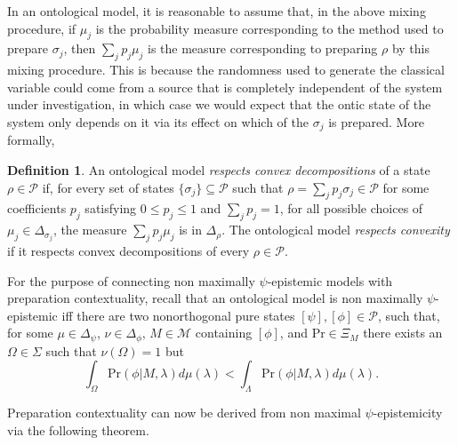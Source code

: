 \documentclass[DIV=calc,paper=a4,fontsize=11pt,twocolumn]{scrartcl} %
\theoremstyle{definition}
\newtheorem{definition}{Definition}[section]
\theoremstyle{plain}
\newcommand{\Proj}[1]{\ensuremath{\left [ #1 \right ]}}
\begin{document}
In an ontological model, it is reasonable to assume that, in the above
mixing procedure, if $\mu_j$ is the probability measure corresponding
to the method used to prepare $\sigma_j$, then $\sum_j p_j \mu_j$ is
the measure corresponding to preparing $\rho$ by this mixing
procedure.  This is because the randomness used to generate the
classical variable could come from a source that is completely
independent of the system under investigation, in which case we would
expect that the ontic state of the system only depends on it via its
effect on which of the $\sigma_j$ is prepared.  More formally,

\begin{definition}
An ontological model \emph{respects convex decompositions} of a
state $\rho \in \mathcal{P}$ if, for every set of states
$\{\sigma_j\} \subseteq \mathcal{P}$ such that $\rho = \sum_j p_j
\sigma_j \in \mathcal{P}$ for some coefficients $p_j$ satisfying $0
\leq p_j \leq 1$ and $\sum_j p_j = 1$, for all possible choices of
$\mu_j \in \Delta_{\sigma_j}$, the measure $\sum_j p_j \mu_j$ is in
$\Delta_{\rho}$.  The ontological model \emph{respects convexity} if
it respects convex decompositions of every $\rho \in \mathcal{P}$.
\end{definition}

For the purpose of connecting non maximally $\psi$-epistemic models
with preparation contextuality, recall that an ontological model is
non maximally $\psi$-epistemic iff there are two nonorthogonal pure
states $\Proj{\psi}, \Proj{\phi} \in \mathcal{P}$, such that, for some
$\mu \in \Delta_{\psi}$, $\nu \in \Delta_{\phi}$, $M \in \mathcal{M}$
containing $\Proj{\phi}$, and $\text{Pr} \in \Xi_M$ there exists an
$\Omega \in \Sigma$ such that $\nu(\Omega) = 1$ but
\begin{equation}
\label{eq:PC:nME}
\int_{\Omega} \text{Pr}(\phi|M,\lambda)d\mu(\lambda) < \int_{\Lambda}
\text{Pr}(\phi|M,\lambda)d\mu(\lambda).
\end{equation}

Preparation contextuality can now be derived from non maximal
$\psi$-epistemicity via the following theorem.
\end{document}
